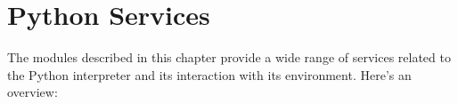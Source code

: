 \chapter{Python Services}
\label{python}

The modules described in this chapter provide a wide range of services
related to the Python interpreter and its interaction with its
environment.  Here's an overview:

\localmoduletable
